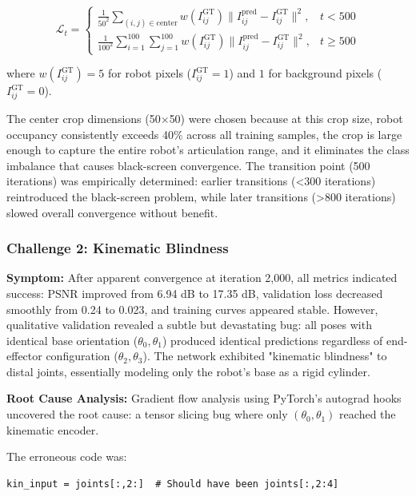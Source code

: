 \documentclass[12pt,a4paper,oneside]{report}
\begin{document}
\begin{equation}
\mathcal{L}_t = \begin{cases}
\frac{1}{50^2} \sum_{(i,j) \in \text{center}} w(I_{ij}^{\text{GT}}) \|I_{ij}^{\text{pred}} - I_{ij}^{\text{GT}}\|^2, & t < 500 \\
\frac{1}{100^2} \sum_{i=1}^{100}\sum_{j=1}^{100} w(I_{ij}^{\text{GT}}) \|I_{ij}^{\text{pred}} - I_{ij}^{\text{GT}}\|^2, & t \geq 500
\end{cases}
\end{equation}

where $w(I_{ij}^{\text{GT}}) = 5$ for robot pixels ($I_{ij}^{\text{GT}} = 1$) and $1$ for background pixels ($I_{ij}^{\text{GT}} = 0$).

The center crop dimensions (50$\times$50) were chosen because at this crop size, robot occupancy consistently exceeds 40\% across all training samples, the crop is large enough to capture the entire robot's articulation range, and it eliminates the class imbalance that causes black-screen convergence. The transition point (500 iterations) was empirically determined: earlier transitions (<300 iterations) reintroduced the black-screen problem, while later transitions (>800 iterations) slowed overall convergence without benefit.

\subsubsection{Challenge 2: Kinematic Blindness}

\textbf{Symptom:} After apparent convergence at iteration 2,000, all metrics indicated success: PSNR improved from 6.94 dB to 17.35 dB, validation loss decreased smoothly from 0.24 to 0.023, and training curves appeared stable. However, qualitative validation revealed a subtle but devastating bug: all poses with identical base orientation ($\theta_0, \theta_1$) produced identical predictions regardless of end-effector configuration ($\theta_2, \theta_3$). The network exhibited "kinematic blindness" to distal joints, essentially modeling only the robot's base as a rigid cylinder.

\textbf{Root Cause Analysis:} Gradient flow analysis using PyTorch's autograd hooks uncovered the root cause: a tensor slicing bug where only $(\theta_0, \theta_1)$ reached the kinematic encoder.

The erroneous code was:
\begin{verbatim}
kin_input = joints[:,2:]  # Should have been joints[:,2:4]
\end{verbatim}
\end{document}
